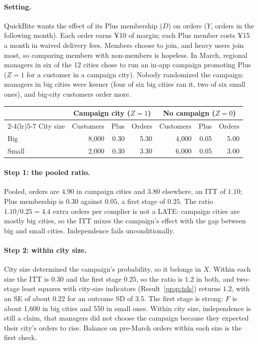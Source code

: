 \documentclass[11pt]{article}
\begin{document}
\sectiontwo

\paragraph{Setting.} QuickBite wants the effect of its Plus membership ($D$) on orders ($Y$, orders in the following month).
Each order earns ¥10 of margin; each Plus member costs ¥15 a month in waived delivery fees. Members choose to join, and heavy
users join most, so comparing members with non-members is hopeless. In March, regional managers in six of the 12 cities chose
to run an in-app campaign promoting Plus ($Z = 1$ for a customer in a campaign city). Nobody randomized the campaign: managers
in big cities were keener (four of six big cities ran it, two of six small ones), and big-city customers order more.

\begin{center}
\small
\begin{tabular}{lrrrrrr}
\toprule
& \multicolumn{3}{c}{Campaign city ($Z = 1$)} & \multicolumn{3}{c}{No campaign ($Z = 0$)} \\
\cmidrule(lr){2-4}\cmidrule(lr){5-7}
City size & Customers & Plus & Orders & Customers & Plus & Orders \\
\midrule
Big & 8{,}000 & 0.30 & 5.30 & 4{,}000 & 0.05 & 5.00 \\
Small & 2{,}000 & 0.30 & 3.30 & 6{,}000 & 0.05 & 3.00 \\
\bottomrule
\end{tabular}
\end{center}

\paragraph{Step 1: the pooled ratio.} Pooled, orders are $4.90$ in campaign cities and $3.80$ elsewhere, an ITT of $1.10$; Plus
membership is $0.30$ against $0.05$, a first stage of $0.25$. The ratio $1.10/0.25 = 4.4$ extra orders per complier is not a
LATE: campaign cities are mostly big cities, so the ITT mixes the campaign's effect with the gap between big and small cities.
Independence fails unconditionally.

\paragraph{Step 2: within city size.} City size determined the campaign's probability, so it belongs in $X$. Within each size
the ITT is $0.30$ and the first stage $0.25$, so the ratio is $1.2$ in both, and two-stage least squares with city-size
indicators (Result~\ref{prop:tsls}) returns $1.2$, with an SE of about $0.22$ for an outcome SD of $3.5$. The first stage is
strong: $F$ is about 1{,}600 in big cities and 550 in small ones. Within city size, independence is still a claim, that managers
did not choose the campaign because they expected their city's orders to rise. Balance on pre-March orders within each size
is the first check.
\end{document}
